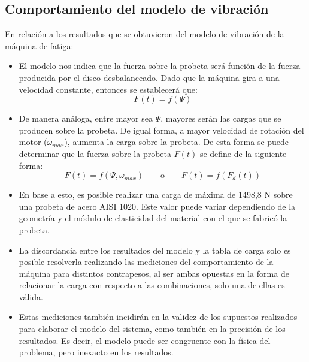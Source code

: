 \subsection{Comportamiento del modelo de vibración}
En relación a los resultados que se obtuvieron del modelo de vibración de la máquina de fatiga:
\begin{itemize}
	\item El modelo nos indica que la fuerza sobre la probeta será función de la fuerza producida por el disco desbalanceado. Dado que la máquina gira a una velocidad constante, entonces se establecerá que:
	\begin{equation*}
		F(t) = f(\Psi)
	\end{equation*}
	\item De manera análoga, entre mayor sea $\Psi$, mayores serán las cargas que se producen sobre la probeta. De igual forma, a mayor velocidad de rotación del motor ($\omega_{max}$), aumenta la carga sobre la probeta. De esta forma se puede determinar que la fuerza sobre la probeta $F(t)$ se define de la siguiente forma:
	\begin{equation*}
		F(t) = f (\Psi, \omega_{max}) \qquad \text{o} \qquad F(t) = f(F_d(t))
	\end{equation*}
	\item En base a esto, es posible realizar una carga de máxima de 1498,8 N sobre una probeta de acero AISI 1020. Este valor puede variar dependiendo de la geometría y el módulo de elasticidad del material con el que se fabricó la probeta.
	\item La discordancia entre los resultados del modelo y la tabla de carga solo es posible resolverla realizando las mediciones del comportamiento de la máquina para distintos contrapesos, al ser ambas opuestas en la forma de relacionar la carga con respecto a las combinaciones, solo una de ellas es válida.
	\item Estas mediciones también incidirán en la validez de los supuestos realizados para elaborar el modelo del sistema, como también en la precisión de los resultados. Es decir, el modelo puede ser congruente con la física del problema, pero inexacto en los resultados.
\end{itemize}

